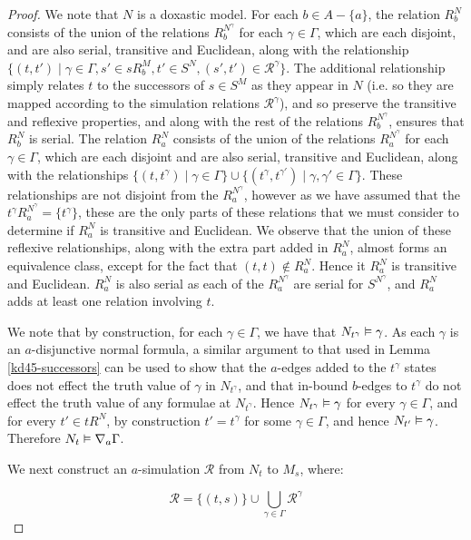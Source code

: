 \begin{proof}
We note that $N$ is a doxastic model. For each $b \in A - \{a\}$, the relation
$R^N_b$ consists of the union of the relations $R^{N^\gamma}_b$ for each $\gamma
\in \Gamma$, which are each disjoint, and are also serial, transitive and
Euclidean, along with the relationship $\{(t, t') \mid \gamma \in \Gamma, s'
\in sR^M_b, t' \in S^N, (s', t') \in \mathcal{R}^\gamma \}$. The additional
relationship simply relates $t$ to the successors of $s \in S^M$ as they appear
in $N$ (i.e. so they are mapped according to the simulation relations
$\mathcal{R}^\gamma$), and so preserve the transitive and reflexive
properties, and along with the rest of the relations $R^{N^\gamma}_b$, ensures
that $R^N_b$ is serial. The relation $R^N_a$ consists of the union of the
relations $R^{N^\gamma}_a$ for each $\gamma \in \Gamma$, which are each disjoint
and are also serial, transitive and Euclidean, along with the relationships
$\{(t, t^\gamma) \mid \gamma \in \Gamma\} \cup \{(t^\gamma, t^{\gamma'}) \mid
\gamma, \gamma' \in \Gamma\}$. These relationships are not disjoint from the
$R^{N^\gamma}_a$, however as we have assumed that the $t^\gamma R^{N^\gamma}_a =
\{t^\gamma\}$, these are the only parts of these relations that we must consider
to determine if $R^N_a$ is transitive and Euclidean. We observe that the union
of these reflexive relationships, along with the extra part added in $R^N_a$,
almost forms an equivalence class, except for the fact that $(t, t) \notin
R^N_a$.  Hence it $R^N_a$ is transitive and Euclidean. $R^N_a$ is also serial as
each of the $R^{N^\gamma}_a$ are serial for $S^{N^\gamma}$, and $R^N_a$ adds at
least one relation involving $t$.

We note that by construction, for each $\gamma \in \Gamma$, we have that
$N_{t^\gamma} \vDash \gamma$. As each $\gamma$ is an $a$-disjunctive normal
formula, a similar argument to that used in Lemma \ref{kd45-successors} can be
used to show that the $a$-edges added to the $t^\gamma$ states does not
effect the truth value of $\gamma$ in $N_{t^\gamma}$, and that in-bound
$b$-edges to $t^\gamma$ do not effect the truth value of any formulae at
$N_{t^\gamma}$. Hence $N_{t^\gamma} \vDash \gamma$ for every $\gamma \in
\Gamma$, and for every $t' \in tR^N$, by construction $t' = t^\gamma$ for some
$\gamma \in \Gamma$, and hence $N_{t'} \vDash \gamma$. Therefore $N_t \vDash
\nabla_a \Gamma$.

We next construct an $a$-simulation $\mathcal{R}$ from $N_t$ to $M_s$,
where:

$$\mathcal{R} = \{(t, s)\} \cup \bigcup_{\gamma \in \Gamma} \mathcal{R}^\gamma$$


\end{proof}
